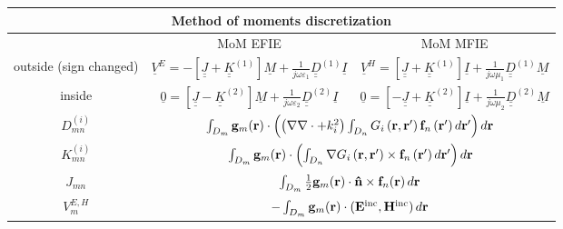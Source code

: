 \begin{table}[h!]
\centering
\begin{tabular}{|c||c|c|}
  \hline
  \multicolumn{3}{|c|}{Method of moments discretization} \\
  \hline
  \hline
   & MoM EFIE & MoM MFIE \\
  \hline
  outside (sign changed) & $\underline{V}^E =  -\left[\underline{\underline{J}} + \underline{\underline{K}}^{(1)} \right] \underline{M} + \frac{1}{j \omega \varepsilon_1}  \underline{\underline{D}}^{(1)} \underline{I}$ & $\underline{V}^H =  \left[\underline{\underline{J}} + \underline{\underline{K}}^{(1)} \right] \underline{I} + \frac{1}{j \omega \mu_1}  \underline{\underline{D}}^{(1)} \underline{M}$ \\
  \hline
  inside  & $\underline{0} =  \left[\underline{\underline{J}} - \underline{\underline{K}}^{(2)} \right] \underline{M} + \frac{1}{j \omega \varepsilon_2}  \underline{\underline{D}}^{(2)} \underline{I}$ & $\underline{0} =  \left[-\underline{\underline{J}} + \underline{\underline{K}}^{(2)} \right] \underline{I} + \frac{1}{j \omega \mu_2}  \underline{\underline{D}}^{(2)} \underline{M}$ \\
  \hline
  \hline
$D_{mn}^{(i)}$ & \multicolumn{2}{|c|}{$\int_{D_m}\mathbf{g}_m \!\left(\mathbf{r}\right) \cdot \left( \left(\nabla \nabla \cdot + k_i^2\right) \int_{D_n} G_i\left(\mathbf{r}, \mathbf{r}'\right) \mathbf{f}_n\left(\mathbf{r}'\right) d\mathbf{r}' \right) d\mathbf{r}$} \\
\hline
 $K_{mn}^{(i)}$ & \multicolumn{2}{|c|}{$\int_{D_m} \mathbf{g}_m \!\left(\mathbf{r}\right) \cdot \left(\int_{D_n} \nabla G_i\left(\mathbf{r}, \mathbf{r}'\right) \times \mathbf{f}_n\left(\mathbf{r}'\right) d\mathbf{r}'\right) d\mathbf{r}$} \\
  \hline
$J_{mn}$ & \multicolumn{2}{|c|}{$\int_{D_m} \frac{1}{2} \mathbf{g}_m \!\left(\mathbf{r}\right) \cdot \mathbf{\hat{n}} \times \mathbf{f}_{n}\!\left(\mathbf{r}\right)d\mathbf{r}$} \\
  \hline
$V_m^{E,H}$ & \multicolumn{2}{|c|}{$-\int_{D_m}\mathbf{g}_m \!\left(\mathbf{r}\right) \cdot \left(\mathbf{E}^\text{inc},\mathbf{H}^\text{inc}\right) d\mathbf{r}$} \\
\hline
\end{tabular}
\end{table}

